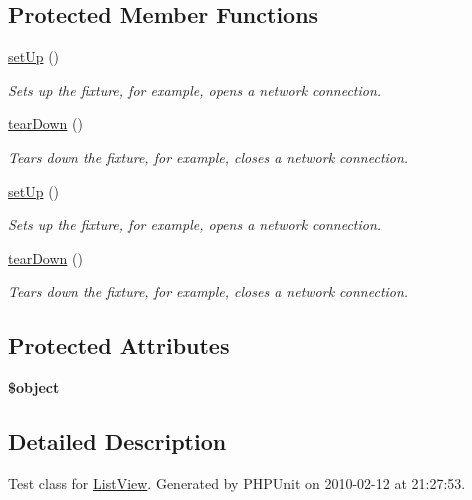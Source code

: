 \subsection*{Protected Member Functions}
\begin{DoxyCompactItemize}
\item 
\hyperlink{class_list_view_test_aaf3f91497b23245168ae263aeb98c713}{setUp} ()
\begin{DoxyCompactList}\small\item\em Sets up the fixture, for example, opens a network connection. \item\end{DoxyCompactList}\item 
\hyperlink{class_list_view_test_a99650175afd5e434a0394aafddcbfacd}{tearDown} ()
\begin{DoxyCompactList}\small\item\em Tears down the fixture, for example, closes a network connection. \item\end{DoxyCompactList}\item 
\hyperlink{class_list_view_test_aaf3f91497b23245168ae263aeb98c713}{setUp} ()
\begin{DoxyCompactList}\small\item\em Sets up the fixture, for example, opens a network connection. \item\end{DoxyCompactList}\item 
\hyperlink{class_list_view_test_a99650175afd5e434a0394aafddcbfacd}{tearDown} ()
\begin{DoxyCompactList}\small\item\em Tears down the fixture, for example, closes a network connection. \item\end{DoxyCompactList}\end{DoxyCompactItemize}
\subsection*{Protected Attributes}
\begin{DoxyCompactItemize}
\item 
\hypertarget{class_list_view_test_a049d32e85601b6c512735d1d7cab4420}{
{\bfseries \$object}}
\label{class_list_view_test_a049d32e85601b6c512735d1d7cab4420}

\end{DoxyCompactItemize}


\subsection{Detailed Description}
Test class for \hyperlink{class_list_view}{ListView}. Generated by PHPUnit on 2010-\/02-\/12 at 21:27:53.

